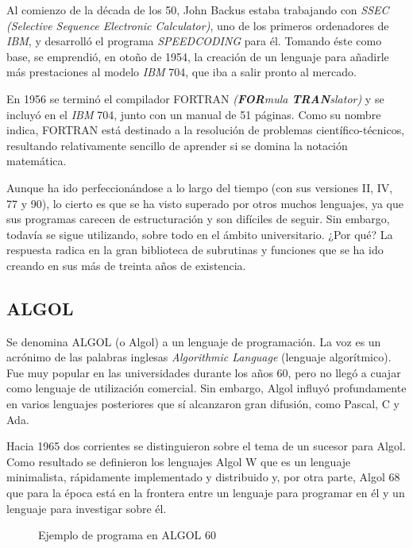 \documentclass[twoside,twocolumn]{article}
\begin{document}
Al comienzo de la década de los 50, John Backus
estaba trabajando con \textit{SSEC (Selective Sequence Electronic Calculator)}, uno de los primeros ordenadores de
\textit{\textit{IBM}}, y desarrolló el programa \textit{SPEEDCODING} para él.
Tomando éste como base, se emprendió, en otoño de
1954, la creación de un lenguaje para añadirle más
prestaciones al modelo \textit{IBM} 704, que iba a salir pronto
al mercado.

En 1956 se terminó el compilador FORTRAN
\textit{(\textbf{FOR}mula \textbf{TRAN}slator)} y se incluyó en el \textit{IBM}\cite{ibm} 704,
junto con un manual de 51 páginas.
Como su nombre indica, FORTRAN está
destinado a la resolución de problemas científico-técnicos, resultando relativamente sencillo de aprender si se
domina la notación matemática.

Aunque ha ido perfeccionándose a lo largo del
tiempo (con sus versiones II, IV, 77 y 90), lo cierto es
que se ha visto superado por otros muchos lenguajes,
ya que sus programas carecen de estructuración y son
difíciles de seguir. Sin embargo, todavía se
sigue utilizando, sobre todo en el ámbito universitario.
¿Por qué? La respuesta radica en la gran biblioteca de
subrutinas y funciones que se ha ido creando en sus
más de treinta años de existencia.

\subsection{ALGOL}

Se denomina ALGOL (o Algol) a un lenguaje de programación. La voz es un acrónimo de las palabras inglesas \textit{Algorithmic Language} (lenguaje algorítmico). Fue muy popular en las universidades durante los años 60, pero no llegó a cuajar como lenguaje de utilización comercial. Sin embargo, Algol influyó profundamente en varios lenguajes posteriores que sí alcanzaron gran difusión, como Pascal, C y Ada.

Hacia 1965 dos corrientes se distinguieron sobre el tema de un sucesor para Algol. Como resultado se definieron los lenguajes Algol W que es un lenguaje minimalista, rápidamente implementado y distribuido y, por otra parte, Algol 68 que para la época está en la frontera entre un lenguaje para programar en él y un lenguaje para investigar sobre él\cite{algolw}.


\begin{figure}[h]
\label{Fig1}
\caption[al.png]{Ejemplo de programa en ALGOL 60 }
\end{figure}
\end{document}
